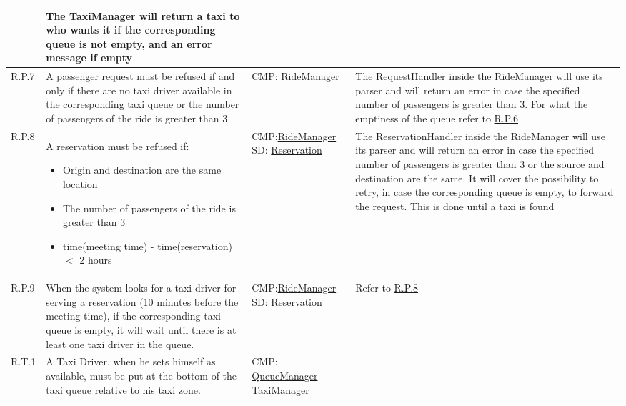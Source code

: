 \begin{center}
\begin{longtable}{|p{}|p{}|>{\raggedright\arraybackslash}p{}|>{\raggedright\arraybackslash}p{}|}
 & The TaxiManager will return a taxi to who wants it if the corresponding queue is not empty, and an error message if empty \\ \hline
R.P.7 & A passenger request must be refused if and only if there are no taxi driver available in the corresponding taxi queue or the number of passengers of the ride is greater than 3 & CMP: \linebreak \hyperref[comp:rideManager]{RideManager} & The  RequestHandler inside the RideManager will use its parser and will return an error in case the specified number of passengers is greater than 3. For what the emptiness of the queue refer to \hyperref[R.P.6]{R.P.6} \\ \hline
R.P.8\label{R.P.8} & A reservation must be refused if:
\begin{itemize}
	\item Origin and destination are the same location
	\item The number of passengers of the ride is greater than 3
	\item time(meeting time) - time(reservation) $<$ 2 hours
\end{itemize} & CMP:\linebreak \hyperref[comp:rideManager]{RideManager} \linebreak SD: \linebreak \hyperref[seq:passengerMakesReservation]{Reservation} & The  ReservationHandler inside the RideManager will use its parser and will return an error in case the specified number of passengers is greater than 3 or the source and destination are the same. It will cover the possibility to retry, in case the corresponding queue is empty, to forward the request. This is done until a taxi is found\\ \hline
R.P.9 & When the system looks for a taxi driver for serving a reservation (10 minutes before the meeting time), if the corresponding taxi queue is empty, it will wait until there is at least one taxi driver in the queue. & CMP:\linebreak \hyperref[comp:rideManager]{RideManager} \linebreak SD: \linebreak \hyperref[seq:passengerMakesReservation]{Reservation} & Refer to \hyperref[R.P.8]{R.P.8}\\ \hhline{|=|=|=|=|}
R.T.1 & A Taxi Driver, when he sets himself as available, must be put at the bottom of the taxi queue relative to his taxi zone. & CMP: \linebreak \hyperref[comp:queueManager]{QueueManager} \linebreak \hyperref[comp:taxiManager]{TaxiManager} \linebreak

\end{longtable}
\end{center}

